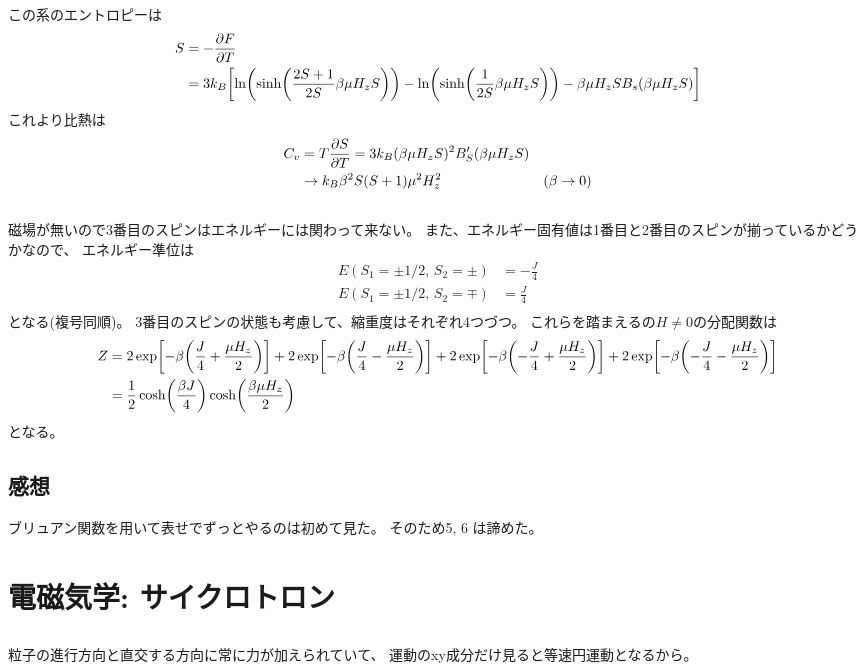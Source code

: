 \documentclass[../../master.tex]{subfiles}
\begin{document}
\subsection{}
この系のエントロピーは
\begin{align}
    S &= -\pdv{F}{T}\\
    &= 3k_B\qty[
        \ln(\sinh(\dfrac{2S+1}{2S}\beta\mu H_z S))-\ln(\sinh(\dfrac{1}{2S}\beta\mu H_z S))
        -\beta\mu H_z S B_s(\beta\mu H_z S)]
\end{align}
これより比熱は
\begin{align}
    C_v &= T\pdv{S}{T} = 3k_B(\beta\mu H_z S)^2 B_S'(\beta\mu H_zS)\\
        &\to k_B \beta^2 S(S+1)\mu^2 H_z^2 &(\beta\to 0)
\end{align}

\subsection{}
磁場が無いので3番目のスピンはエネルギーには関わって来ない。
また、エネルギー固有値は1番目と2番目のスピンが揃っているかどうかなので、
エネルギー準位は
\begin{align}
    E(S_1=\pm 1/2,\,S_2=\pm) &= -\frac{J}{4}\\
    E(S_1=\pm 1/2,\,S_2=\mp) &= \frac{J}{4}\\
\end{align}
となる(複号同順)。
3番目のスピンの状態も考慮して、縮重度はそれぞれ4つづつ。
これらを踏まえるの\(H\neq 0\)の分配関数は
\begin{align}
    Z
    &= 2\exp[-\beta\qty(\frac{J}{4}+\frac{\mu H_z}{2})]
        + 2\exp[-\beta\qty(\frac{J}{4}-\frac{\mu H_z}{2})]
        + 2\exp[-\beta\qty(-\frac{J}{4}+\frac{\mu H_z}{2})]
        + 2\exp[-\beta\qty(-\frac{J}{4}-\frac{\mu H_z}{2})]\\
    &= \frac{1}{2}\cosh(\frac{\beta J}{4})\cosh(\frac{\beta\mu H_z}{2})
\end{align}
となる。

\subsection*{感想}
ブリュアン関数を用いて表せでずっとやるのは初めて見た。
そのため5, 6 は諦めた。

\clearpage
\section{電磁気学: サイクロトロン}
\subsection{}
粒子の進行方向と直交する方向に常に力が加えられていて、
運動のxy成分だけ見ると等速円運動となるから。
\end{document}
